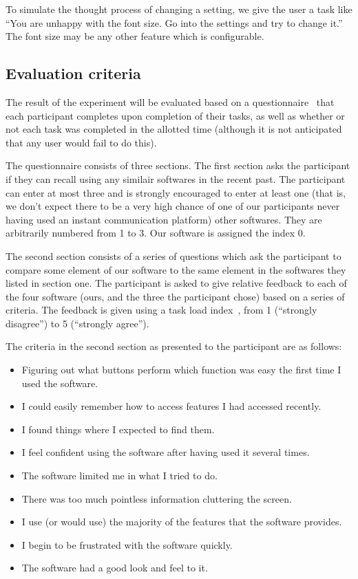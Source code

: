 \documentclass{sigchi}
\begin{document}
  To simulate the thought process of changing a setting, we give the user a
  task like ``You are unhappy with the font size. Go into the settings and try to 
  change it.'' The font size may be any other feature which is configurable. 

 \subsection{Evaluation criteria} 
  The result of the experiment will be evaluated based on a
  questionnaire~\cite[p. 173]{Mackenzie:HCI} that each participant completes
  upon completion of their tasks, as well as whether or not each task was
  completed in the allotted time (although it is not anticipated that any user
  would fail to do this).

  The questionnaire consists of three sections. The first section asks the participant 
  if they can recall using any similair softwares in the recent past. The participant
  can enter at most three and is strongly encouraged to enter at least one (that is, 
  we don't expect there to be a very high chance of one of our participants never having
  used an instant communication platform) other softwares. They are arbitrarily numbered
  from 1 to 3. Our software is assigned the index 0. 

  The second section consists of a series of questions which ask the participant
  to compare some element of our software to the same element in the softwares
  they listed in section one. The participant is asked to give relative feedback
  to each of the four software (ours, and the three the participant chose) based
  on a series of criteria. The feedback is given using a task load
  index~\cite[p. 174]{Norman:DET}, from 1 (``strongly disagree'') to 5
  (``strongly agree'').

  The criteria in the second section as presented to the participant are as follows:
  \begin{itemize}
  \item Figuring out what buttons perform which function was easy the first time I used the software.
  \item I could easily remember how to access features I had accessed recently. 
  \item I found things where I expected to find them. 
  \item I feel confident using the software after having used it several times. 
  \item The software limited me in what I tried to do.
  \item There was too much pointless information cluttering the screen.
  \item I use (or would use) the majority of the features that the software provides.
  \item I begin to be frustrated with the software quickly. 
  \item The software had a good look and feel to it.
  \end{itemize}
\end{document}
